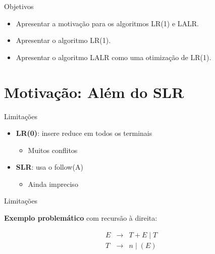 \subtitle{\bf Aula 10 - Motivação}
\begin{frame}[t,plain]
    \titlepage
\end{frame}

\begin{frame}{Objetivos}

    \begin{itemize}
        \item
        Apresentar a motivação para os algoritmos LR(1) e LALR.
        \item
        Apresentar o algoritmo LR(1).
        \item
        Apresentar o algoritmo LALR como uma otimização de LR(1).
    \end{itemize}
\end{frame}


\section{Motivação: Além do SLR}\label{motivauxe7uxe3o-aluxe9m-do-slr}

\begin{frame}{Limitações}

    \begin{itemize}

        \item
        \textbf{LR(0)}: insere reduce em todos os terminais

        \begin{itemize}

            \item
            Muitos conflitos
        \end{itemize}
        \item
        \textbf{SLR}: usa o follow(A)

        \begin{itemize}

            \item
            Ainda impreciso
        \end{itemize}
    \end{itemize}
\end{frame}

\begin{frame}{Limitações}

    \textbf{Exemplo problemático} com recursão à direita:

    \[\begin{array}{lcl}
    E &\to& T + E \mid T \\
    T &\to& n \mid (E)
\end{array}\]
\end{frame}

